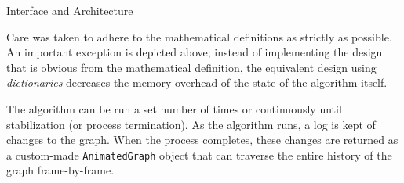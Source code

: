 \documentclass{beamer}
\begin{document}
\begin{frame}[fragile,t]
\begin{columns}[t]
\begin{column}{.45\textwidth}
\begin{block}{Interface and Architecture}
\begin{center}
          \end{center}
        Care was taken to adhere to the mathematical definitions
          as strictly as possible.
        An important exception is depicted above;
          instead of implementing the design that
          is obvious from the mathematical definition,
          the equivalent design using \emph{dictionaries}
          decreases the memory overhead of the state
          of the algorithm itself.

        \vspace{.15in}

        The algorithm can be run a set number of times or continuously
        until stabilization (or process termination).  As the
        algorithm runs, a log is kept of changes to the graph.  When
        the process completes, these changes are returned as a
        custom-made \texttt{AnimatedGraph} object that can traverse
        the entire history of the graph frame-by-frame.
      \end{block}
    \end{column}
  \end{columns}
\end{frame}
\end{document}
